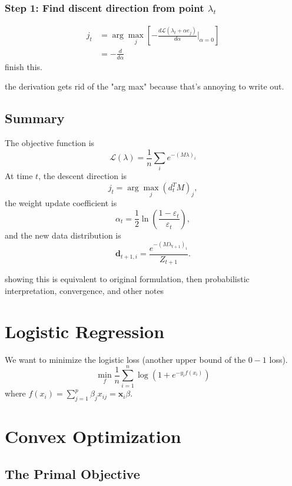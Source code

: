\documentclass{article}
\begin{document}
\subsubsection{Step 1: Find discent direction from point $\lambda_t$}
\begin{align*}
	j_t &= \arg\max_j \left[ -\frac{d\mathcal{L}(\lambda_t+\alpha e_j)}{d \alpha} \Big|_{\alpha=0} \right] \\
	    &= - \frac{d }{d \alpha} 
\end{align*}
{\color{red}finish this.} 

{\color{red}the derivation gets rid of the "arg max" because that's annoying to write out.} 


\subsection{Summary}
The objective function is
\[
	\mathcal{L}(\lambda) = \frac{1}{n} \sum_i e^{-(M\lambda)_i}
\] 
At time $t$, the descent direction is
\[
	j_t = \arg\max_j (d_t^T M)_j,
\]
the weight update coefficient is
\[
	\alpha_t = \frac{1}{2} \ln \left( \frac{1-\varepsilon_t}{\varepsilon_t}  \right),
\] 
and the new data distribution is
\[
	\mathbf{d}_{t+1,i}= \frac{e^{-(M\lambda_{t+1})_i}}{Z_{t+1}}.
\]


{\color{red}showing this is equivalent to original formulation, then probabilistic interpretation, convergence, and other notes} 




\section{Logistic Regression}
We want to minimize the logistic loss (another upper bound of the $0-1$ loss).
\[
	\min_f \frac{1}{n} \sum_{i=1}^{n} \log \left( 1 + e^{-y_i f(x_i)} \right)
\] 
where $f(x_i) = \sum_{j=1}^{p} \beta_j x_{ij} = \mathbf{x}_i \beta$.



\section{Convex Optimization}


\subsection{The Primal Objective}
\end{document}
